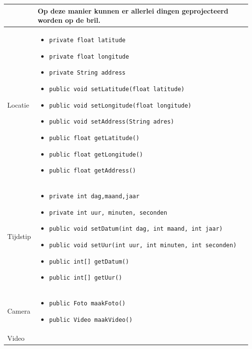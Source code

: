 \documentclass[12pt,a4paper,oneside]{article}
\begin{document}
\begin{longtable}{|l|p{6cm}|p{5cm}|}
\begin{itemize}[parsep=-2pt,leftmargin=0.3cm]
\end{itemize}& Op deze manier kunnen er allerlei dingen geprojecteerd worden op de bril.\\
\hline
Locatie&\vspace*{-10mm}\begin{itemize}[parsep=-2pt,leftmargin=0.3cm]
\item \texttt{private float latitude} 
\item \texttt{private float longitude}
\item \texttt{private String address}
\item \texttt{public void setLatitude(float latitude)}
\item \texttt{public void setLongitude(float longitude)}
\item \texttt{public void setAddress(String adres)}
\item \texttt{public float getLatitude()}
\item \texttt{public float getLongitude()}
\item \texttt{public float getAddress()}
\vspace*{-6mm} 
\end{itemize}&\\
\hline
Tijdstip&\vspace*{-10mm}\begin{itemize}[parsep=-2pt,leftmargin=0.3cm]
\item \texttt{private int dag,maand,jaar} 
\item \texttt{private int uur, minuten, seconden} 
\item \texttt{public void setDatum(int dag, int maand, int jaar)}
\item \texttt{public void setUur(int uur, int minuten, int seconden)}
\item \texttt{public int[] getDatum()}
\item \texttt{public int[] getUur()}
\vspace*{-6mm} \end{itemize}&\\
\hline
Camera&\vspace*{-10mm}\begin{itemize}[parsep=-2pt,leftmargin=0.3cm]
\item \texttt{public Foto maakFoto()} 
\item \texttt{public Video maakVideo()}\vspace*{-6mm} \end{itemize}&\\
\hline
Video&\vspace*{-10mm}\begin{itemize}[parsep=-2pt,leftmargin=0.3cm]

\end{itemize}
\end{longtable}
\end{document}
